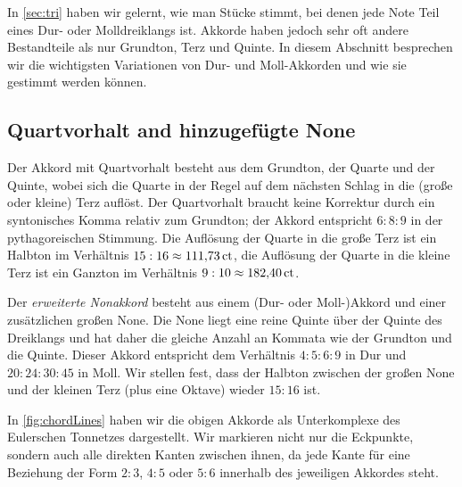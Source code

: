 In \cref{sec:tri} haben wir gelernt, wie man Stücke stimmt, bei denen jede Note
Teil eines Dur- oder Molldreiklangs ist. Akkorde haben jedoch sehr oft andere
Bestandteile als nur Grundton, Terz und Quinte. In diesem Abschnitt besprechen
wir die wichtigsten Variationen von Dur- und Moll-Akkorden und wie sie gestimmt
werden können.

\subsection{Quartvorhalt and hinzugefügte None}
\label{sec:49}

Der Akkord mit Quartvorhalt besteht aus dem Grundton, der Quarte und der Quinte,
wobei sich die Quarte in der Regel auf dem nächsten Schlag in die (große oder
kleine) Terz auflöst. Der Quartvorhalt braucht keine Korrektur durch ein
syntonisches Komma relativ zum Grundton; der Akkord entspricht $6:8:9$ in der
pythagoreischen Stimmung.
Die Auflösung der Quarte in die große Terz ist ein Halbton im Verhältnis
$15:16\approx 111{,}73\,\mathrm{ct}$,
die Auflösung der Quarte in die kleine Terz ist ein Ganzton im Verhältnis
$9:10\approx 182{,}40\,\mathrm{ct}$.


Der \emph{erweiterte Nonakkord}
besteht aus einem (Dur- oder Moll-)Akkord und einer zusätzlichen großen None.
Die None liegt eine reine Quinte über der Quinte des Dreiklangs und hat daher
die gleiche Anzahl an Kommata wie der Grundton und die Quinte. Dieser Akkord
entspricht dem Verhältnis $4:5:6:9$ in Dur und $20:24:30:45$ in Moll. Wir
stellen fest, dass der Halbton zwischen der großen None und der kleinen Terz
(plus eine Oktave) wieder $15:16$ ist.

In \cref{fig:chordLines} haben wir die obigen Akkorde als Unterkomplexe des
Eulerschen Tonnetzes dargestellt. Wir markieren nicht nur die Eckpunkte, sondern
auch alle direkten Kanten zwischen ihnen, da jede Kante für eine Beziehung der
Form $2:3$, $4:5$ oder $5:6$ innerhalb des jeweiligen Akkordes steht.


